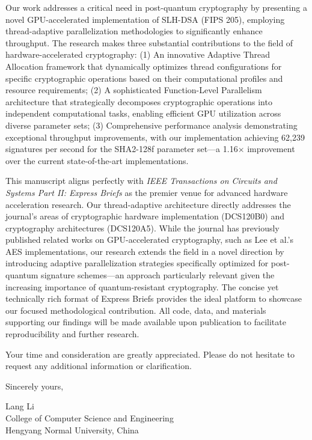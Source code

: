\documentclass{article}
\begin{document}
Our work addresses a critical need in post-quantum cryptography by presenting a novel GPU-accelerated implementation of SLH-DSA (FIPS 205), employing thread-adaptive parallelization methodologies to significantly enhance throughput. The research makes three substantial contributions to the field of hardware-accelerated cryptography:
(1) An innovative Adaptive Thread Allocation framework that dynamically optimizes thread configurations for specific cryptographic operations based on their computational profiles and resource requirements;
(2) A sophisticated Function-Level Parallelism architecture that strategically decomposes cryptographic operations into independent computational tasks, enabling efficient GPU utilization across diverse parameter sets;
(3) Comprehensive performance analysis demonstrating exceptional throughput improvements, with our implementation achieving 62,239 signatures per second for the SHA2-128f parameter set—a 1.16$\times$ improvement over the current state-of-the-art implementations.

This manuscript aligns perfectly with \textit{IEEE Transactions on Circuits and Systems Part II: Express Briefs} as the premier venue for advanced hardware acceleration research. Our thread-adaptive architecture directly addresses the journal's areas of cryptographic hardware implementation (DCS120B0) and cryptography architectures (DCS120A5). While the journal has previously published related works on GPU-accelerated cryptography, such as Lee et al.'s AES implementations, our research extends the field in a novel direction by introducing adaptive parallelization strategies specifically optimized for post-quantum signature schemes—an approach particularly relevant given the increasing importance of quantum-resistant cryptography. The concise yet technically rich format of Express Briefs provides the ideal platform to showcase our focused methodological contribution. All code, data, and materials supporting our findings will be made available upon publication to facilitate reproducibility and further research.

Your time and consideration are greatly appreciated. Please do not hesitate to request any additional information or clarification.

\bigskip %

Sincerely yours,

\vspace{20pt} %


Lang Li \\
College of Computer Science and Engineering\\
Hengyang Normal University, China \\
\end{document}

